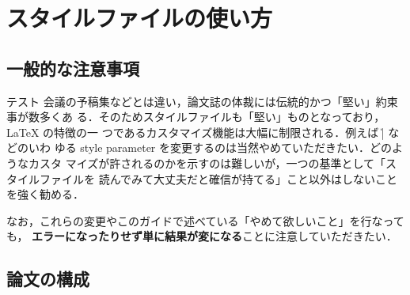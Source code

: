 \section{スタイルファイルの使い方}
\subsection{一般的な注意事項}
テスト
会議の予稿集などとは違い，論文誌の体裁には伝統的かつ「堅い」約束事が数多くあ
る．そのためスタイルファイルも「堅い」ものとなっており，{\LaTeX} の特徴の一
つであるカスタマイズ機能は大幅に制限される．例えば \|\textheight| などのいわ
ゆる style parameter を変更するのは当然やめていただきたい．どのようなカスタ
マイズが許されるのかを示すのは難しいが，一つの基準として「スタイルファイルを
読んでみて大丈夫だと確信が持てる」こと以外はしないことを強く勧める．

なお，これらの変更やこのガイドで述べている「やめて欲しいこと」を行なっても，
{\bf エラーになったりせず単に結果が変になる}ことに注意していただきたい．


\subsection{論文の構成}\label{sec:config}

